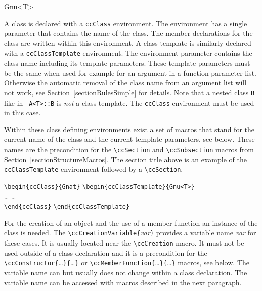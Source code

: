 \documentclass[11pt]{article}
\makeatletter
\newcommand{\Eindex}[1]{\index{#1 environment@{\tt #1} environment}}
\newcommand{\Dindex}[1]{#1\index{#1}}
\makeatother
\begin{document}
\begin{ccClassTemplate}{Gnu<T>}
\label{sectionClass}

%
\Eindex{ccClass}
%
\Eindex{ccClassTemplate}

A class is declared with a {\tt ccClass} environment. The environment
has a single parameter that contains the name of the class. The member
declarations for the class are written within this environment.  A
class template is similarly declared with a {\tt ccClassTemplate}
environment.  The environment parameter contains the class name
including its template parameters. These template parameters must be
the same when used for example for an argument in a function parameter
list. Otherwise the automatic removal of the class name from an
argument list will not work, see Section~\ref{sectionRulesSimple} for
details. Note that a \Dindex{nested class} {\tt B} like in {\tt
  A<T>::B} is {\em not} a class template. The {\tt ccClass}
environment must be used in this case.

Within these class defining environments exist a set of macros that
stand for the current name of the class and the current template
parameters, see below.  These names are the precondition for the
\verb+\ccSection+ and \verb+\ccSubsection+ macros from
Section~\ref{sectionStructureMacros}. The section title above is an
example of the {\tt ccClassTemplate} environment followed by a
\verb+\ccSection+.

\begin{tabbing}
  \> \verb+\begin{ccClass}{Gnat}+      \>
     \verb+\begin{ccClassTemplate}{Gnu<T>}+      \\
  \> \hspace*{7mm}\ldots  \> \hspace*{7mm}\ldots \\
  \> \verb+\end{ccClass}+ \>
     \verb+\end{ccClassTemplate}+
\end{tabbing}

For the creation of an object and the use of a member function an
instance of the class is needed. The
\verb+\ccCreationVariable{+{\em var\/}\verb+}+ provides a
variable name {\em var\/} for these cases. It is usually located near
the \verb+\ccCreation+ macro. It must not be used outside of a
class declaration and it is a precondition for the
\verb+\ccConstructor{+\ldots\verb+}{+\ldots\verb+}+ or
\verb+\ccMemberFunction{+\ldots\verb+}{+\ldots\verb+}+ macros,
see below. The variable name can but usually does not change within
a class declaration. The variable name can be accessed with macros
described in the next paragraph.


\end{ccClassTemplate}
\end{document}
